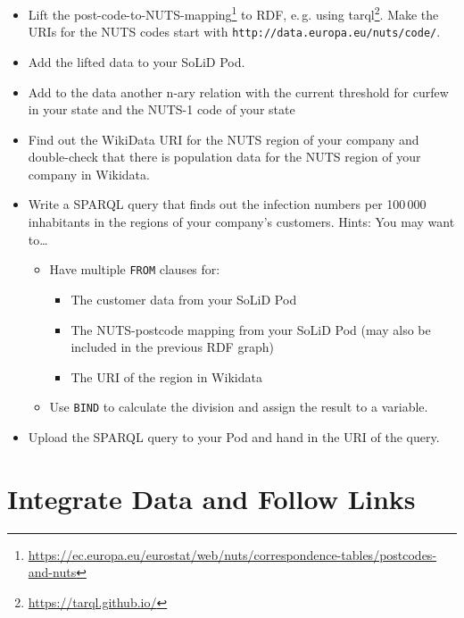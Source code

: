 \documentclass[DIV=12]{scrartcl}
\makeatletter
\newcommand{\eg}{e.\,g.\@\xspace}
\makeatother
\begin{document}
\begin{itemize}
\item Lift the post-code-to-NUTS-mapping\footnote{\url{https://ec.europa.eu/eurostat/web/nuts/correspondence-tables/postcodes-and-nuts}} to RDF, \eg using tarql\footnote{\url{https://tarql.github.io/}}. Make the URIs for the NUTS codes start with \nolinkurl{http://data.europa.eu/nuts/code/}.
\item Add the lifted data to your SoLiD Pod.
\item Add to the data another n-ary relation with the current threshold for curfew in your state and the NUTS-1 code of your state
\item Find out the WikiData URI for the NUTS region of your company and double-check that there is population data for the NUTS region of your company in Wikidata.
\item Write a SPARQL query that finds out the infection numbers per 100\,000 inhabitants in the regions of your company's customers. Hints: You may want to\dots
\begin{itemize}
\item Have multiple \texttt{FROM} clauses for:
\begin{itemize}
\item The customer data from your SoLiD Pod
\item The NUTS-postcode mapping from your SoLiD Pod (may also be included in the previous RDF graph)
\item The URI of the region in Wikidata
\end{itemize}
\item Use \texttt{BIND} to calculate the division and assign the result to a variable.
\end{itemize}

\item Upload the SPARQL query to your Pod and hand in the URI of the query.
\end{itemize}


\section{Integrate Data and Follow Links}
\end{document}
